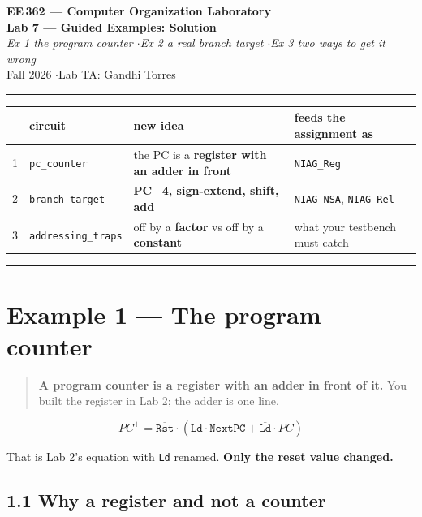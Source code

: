\documentclass[11pt]{article}
\newcommand{\code}[1]{\texttt{#1}}
\newcommand{\hr}{\vspace{2pt}\hrule\vspace{6pt}}
\begin{document}
\begin{center}
{\Large\bfseries EE\,362 --- Computer Organization Laboratory}\\[2pt]
{\large\bfseries Lab 7 --- Guided Examples: Solution}\\[2pt]
{\itshape Ex 1 the program counter \quad$\cdot$\quad Ex 2 a real branch target \quad$\cdot$\quad Ex 3 two ways to get it wrong}\\[4pt]
Fall 2026 \quad$\cdot$\quad Lab TA: Gandhi Torres
\end{center}
\hr

\begin{center}
\small
\begin{tabular}{cl>{\raggedright\arraybackslash}p{6.0cm}>{\raggedright\arraybackslash}p{3.8cm}}
\toprule
& circuit & new idea & feeds the assignment as \\
\midrule
1 & \code{pc\_counter} & the PC is a \textbf{register with an adder in front} & \code{NIAG\_Reg} \\
2 & \code{branch\_target} & \textbf{PC+4, sign-extend, shift, add} & \code{NIAG\_NSA}, \code{NIAG\_Rel} \\
3 & \code{addressing\_traps} & off by a \textbf{factor} vs off by a \textbf{constant} & what your testbench must catch \\
\bottomrule
\end{tabular}
\end{center}

\vspace{4pt}\hr

\section*{Example 1 --- The program counter}

\begin{quote}
\textbf{A program counter is a register with an adder in front of it.} You built
the register in Lab 2; the adder is one line.
\end{quote}

\[
PC^{+} = \overline{\code{Rst}}\cdot\left( \code{Ld}\cdot \code{NextPC} + \overline{\code{Ld}}\cdot PC \right)
\]

That is Lab 2's equation with \code{Ld} renamed. \textbf{Only the reset value
changed.}

\subsection*{1.1 Why a register and not a counter}
\end{document}
